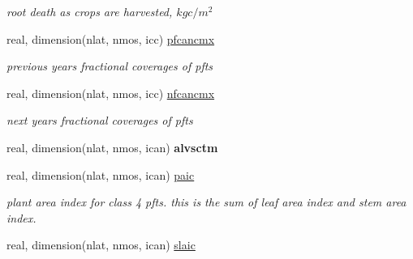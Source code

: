 \begin{DoxyCompactItemize}
\begin{DoxyCompactList}\small\item\em root death as crops are harvested, $kg c/m^2$ \end{DoxyCompactList}\item 
\hypertarget{structctem__statevars_1_1veg__rot_a8f2b20847568aa585a33c3fa1631f12a}{}real, dimension(nlat, nmos, icc) \hyperlink{structctem__statevars_1_1veg__rot_a8f2b20847568aa585a33c3fa1631f12a}{pfcancmx}\label{structctem__statevars_1_1veg__rot_a8f2b20847568aa585a33c3fa1631f12a}

\begin{DoxyCompactList}\small\item\em previous year\textquotesingle{}s fractional coverages of pfts \end{DoxyCompactList}\item 
\hypertarget{structctem__statevars_1_1veg__rot_a3ab103512cda1576ebeb76a3e0d1d6d0}{}real, dimension(nlat, nmos, icc) \hyperlink{structctem__statevars_1_1veg__rot_a3ab103512cda1576ebeb76a3e0d1d6d0}{nfcancmx}\label{structctem__statevars_1_1veg__rot_a3ab103512cda1576ebeb76a3e0d1d6d0}

\begin{DoxyCompactList}\small\item\em next year\textquotesingle{}s fractional coverages of pfts \end{DoxyCompactList}\item 
\hypertarget{structctem__statevars_1_1veg__rot_a3620434a43dd413dadbc2df0ab4c1a0c}{}real, dimension(nlat, nmos, ican) {\bfseries alvsctm}\label{structctem__statevars_1_1veg__rot_a3620434a43dd413dadbc2df0ab4c1a0c}

\item 
\hypertarget{structctem__statevars_1_1veg__rot_ab8144fc5348967ab33132c88b7235069}{}real, dimension(nlat, nmos, ican) \hyperlink{structctem__statevars_1_1veg__rot_ab8144fc5348967ab33132c88b7235069}{paic}\label{structctem__statevars_1_1veg__rot_ab8144fc5348967ab33132c88b7235069}

\begin{DoxyCompactList}\small\item\em plant area index for class\textquotesingle{} 4 pfts. this is the sum of leaf area index and stem area index. \end{DoxyCompactList}\item 
\hypertarget{structctem__statevars_1_1veg__rot_a2d77c552f815b9a3794df8cd396cba03}{}real, dimension(nlat, nmos, ican) \hyperlink{structctem__statevars_1_1veg__rot_a2d77c552f815b9a3794df8cd396cba03}{slaic}\label{structctem__statevars_1_1veg__rot_a2d77c552f815b9a3794df8cd396cba03}


\end{DoxyCompactItemize}
